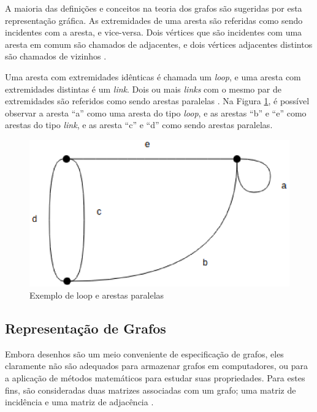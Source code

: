 A maioria das definições e conceitos na teoria dos grafos são sugeridas por esta representação gráfica. As extremidades de uma aresta são referidas como sendo incidentes com a aresta, e vice-versa. Dois vértices que são incidentes com uma aresta em comum são chamados de adjacentes, e dois vértices adjacentes distintos são chamados de vizinhos \cite{Costa:2011}.

Uma aresta com extremidades idênticas é chamada um \textit{loop}, e uma aresta com extremidades distintas é um \textit{link}. Dois ou mais \textit{links} com o mesmo par de extremidades são referidos como sendo arestas paralelas \cite{Bondy:2007}. Na Figura \ref{loop_paralela}, é possível observar a aresta ``a'' como uma aresta do tipo \textit{loop}, e as arestas ``b'' e ``e'' como arestas do tipo \textit{link}, e as aresta ``c'' e ``d'' como sendo arestas paralelas.

\newpage

\begin{figure}[!h]
	\centering
	\includegraphics[scale=0.4]{figuras/capitulo2/loop_paralela.eps}
	\caption[Exemplo de loop e arestas paralelas]{Exemplo de loop e arestas paralelas \cite{Bondy:2007}}
	\label{loop_paralela}
\end{figure}

\subsection{Representação de Grafos}

Embora desenhos são um meio conveniente de especificação de grafos, eles claramente não são adequados para armazenar grafos em computadores, ou para a aplicação de métodos matemáticos para estudar suas propriedades. Para estes fins, são consideradas duas matrizes associadas com um grafo; uma matriz de incidência e uma matriz de adjacência \cite{Bondy:2007}.

